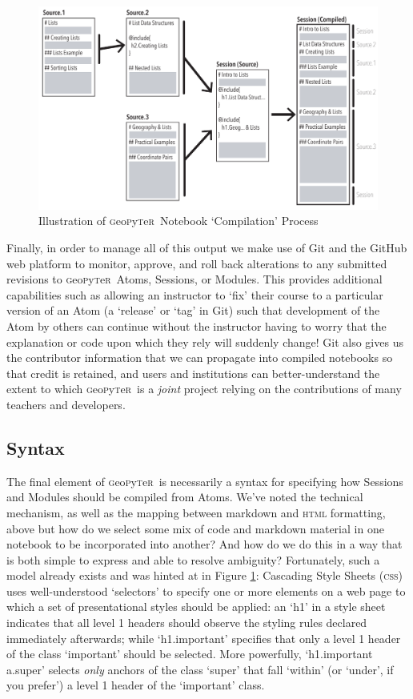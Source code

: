 \documentclass[letter, 11pt]{article}
\newcommand{\gp}{\textsc{g}eo\textsc{p}y\textsc{t}e\textsc{r}~\/}
\begin{document}
\begin{figure}[hbtp]
  \centering
  \includegraphics[width=\textwidth, angle=0]{Illustration.pdf}
  \caption{Illustration of \gp Notebook `Compilation' Process}
  \label{fig:Illustration}
\end{figure}

Finally, in order to manage all of this output we make use of Git and the GitHub
web platform to monitor, approve, and roll back alterations to any submitted
revisions to \gp Atoms, Sessions, or Modules. This provides additional
capabilities such as allowing an instructor to `fix' their course to a
particular version of an Atom (a `release' or `tag' in Git) such that
development of the Atom by others can continue without the instructor having to
worry that the explanation or code upon which they rely will suddenly change!
Git also gives us the contributor information that we can propagate into
compiled notebooks so that credit is retained, and users and institutions can
better-understand the extent to which \gp is a \emph{joint} project relying on
the contributions of many teachers and developers.

\subsection{Syntax}\label{syntax}

The final element of \gp is necessarily a syntax for specifying how Sessions and
Modules should be compiled from Atoms. We've noted the technical mechanism, as
well as the mapping between markdown and \textsc{html} formatting, above but how
do we select some mix of code and markdown material in one notebook to be
incorporated into another? And how do we do this in a way that is both simple to
express and able to resolve ambiguity? Fortunately, such a model already exists
and was hinted at in Figure \ref{fig:Illustration}: Cascading Style Sheets
(\textsc{css}) uses well-understood `selectors' to specify one or more elements
on a web page to which a set of presentational styles should be applied: an `h1'
in a style sheet indicates that all level 1 headers should observe the styling
rules declared immediately afterwards; while `h1.important' specifies that only
a level 1 header of the class `important' should be selected. More powerfully,
`h1.important a.super' selects \emph{only} anchors of the class `super' that
fall `within' (or `under', if you prefer') a level 1 header of the `important'
class.
\end{document}
